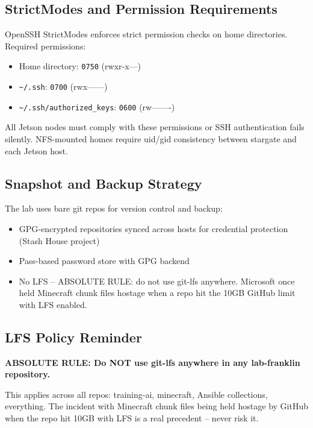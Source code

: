 \subsection{StrictModes and Permission Requirements}

OpenSSH StrictModes enforces strict permission checks on home directories. Required permissions:

\begin{itemize}
    \item Home directory: \texttt{0750} (rwxr-x---)
    
    \item \texttt{\textasciitilde/.ssh}: \texttt{0700} (rwx------)
    
    \item \texttt{\textasciitilde/.ssh/authorized\_keys}: \texttt{0600} (rw-------)
\end{itemize}

All Jetson nodes must comply with these permissions or SSH authentication fails silently. NFS-mounted homes require uid/gid consistency between stargate and each Jetson host.

\subsection{Snapshot and Backup Strategy}

The lab uses bare git repos for version control and backup:
\begin{itemize}
    \item GPG-encrypted repositories synced across hosts for credential protection (Stash House project)
    \item Pass-based password store with GPG backend
    \item No LFS -- ABSOLUTE RULE: do not use git-lfs anywhere. Microsoft once held Minecraft chunk files hostage when a repo hit the 10GB GitHub limit with LFS enabled.
\end{itemize}

\subsection{LFS Policy Reminder}

\textbf{ABSOLUTE RULE: Do NOT use git-lfs anywhere in any lab-franklin repository.}

This applies across all repos: training-ai, minecraft, Ansible collections, everything. The incident with Minecraft chunk files being held hostage by GitHub when the repo hit 10GB with LFS is a real precedent -- never risk it.
